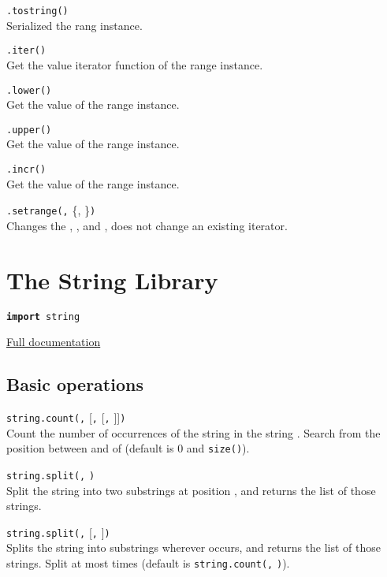\hangpar {}\texttt{.tostring()}\\
Serialized the rang instance.

\hangpar {}\texttt{.iter()}\\
Get the value iterator function of the range instance. 

\hangpar {}\texttt{.lower()}\\
Get the  value of the range instance.

\hangpar {}\texttt{.upper()}\\
Get the  value of the range instance.

\hangpar {}\texttt{.incr()}\\
Get the  value of the range instance.

\hangpar {}\texttt{.setrange(}\texttt{,} \{, \}\texttt{)}\\
Changes the , , and , does not change an existing iterator.

\section*{The String Library}

\hangpar \texttt{\textbf{import} string}

\hangpar \href{https://github.com/berry-lang/berry/wiki/Chapter-7\#string-module}{Full documentation}

\subsection*{Basic operations}

\hangpar \texttt{string.count(}\texttt{,} [\texttt{,} [\texttt{,} ]]\texttt{)}\\
Count the number of occurrences of the  string in the string . Search from the position between  and  of  (default is $0$ and \texttt{size(}\texttt{)}).

\hangpar \texttt{string.split(}\texttt{,} \texttt{)}\\
Split the string  into two substrings at position , and returns the list of those strings.

\hangpar \texttt{string.split(}\texttt{,} [\texttt{,} ]\texttt{)}\\
Splits the string  into substrings wherever  occurs, and returns the list of those strings. Split at most  times (default is \texttt{string.count(}\texttt{,} \texttt{)}).

